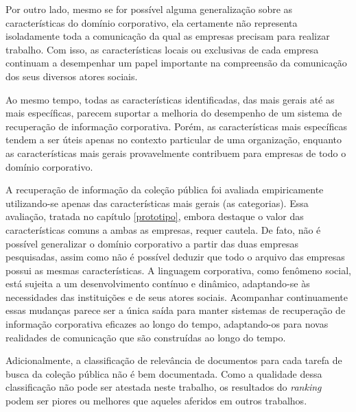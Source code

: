 Por outro lado, mesmo se for possível alguma generalização sobre as características do domínio corporativo, ela certamente não representa isoladamente toda a comunicação da qual as empresas precisam para realizar trabalho. Com isso, as características locais ou exclusivas de cada empresa continuam a desempenhar um papel importante na compreensão da comunicação dos seus diversos atores sociais.

Ao mesmo tempo, todas as características identificadas, das mais gerais até as mais específicas, parecem suportar a melhoria do desempenho de um sistema de recuperação de informação corporativa. Porém, as características mais específicas tendem a ser úteis apenas no contexto particular de uma organização, enquanto as características mais gerais provavelmente contribuem para empresas de todo o domínio corporativo.%

A recuperação de informação da coleção pública foi avaliada empiricamente utilizando-se apenas das características mais gerais (as categorias). Essa avaliação, tratada no capítulo \ref{prototipo}, embora destaque o valor das características comuns a ambas as empresas, requer cautela. De fato, não é possível generalizar o domínio corporativo a partir das duas empresas pesquisadas, assim como não é possível deduzir que todo o arquivo das empresas possui as mesmas características. A linguagem corporativa, como fenômeno social, está sujeita a um desenvolvimento contínuo e dinâmico, adaptando-se às necessidades das instituições e de seus atores sociais. Acompanhar continuamente essas mudanças parece ser a única saída para manter sistemas de recuperação de informação corporativa eficazes ao longo do tempo, adaptando-os para novas realidades de comunicação que são construídas ao longo do tempo.

Adicionalmente, a classificação de relevância de documentos para cada tarefa de busca da coleção pública não é bem documentada. Como a qualidade dessa classificação não pode ser atestada neste trabalho, os resultados do \textit{ranking} podem ser piores ou melhores que aqueles aferidos em outros trabalhos. 


